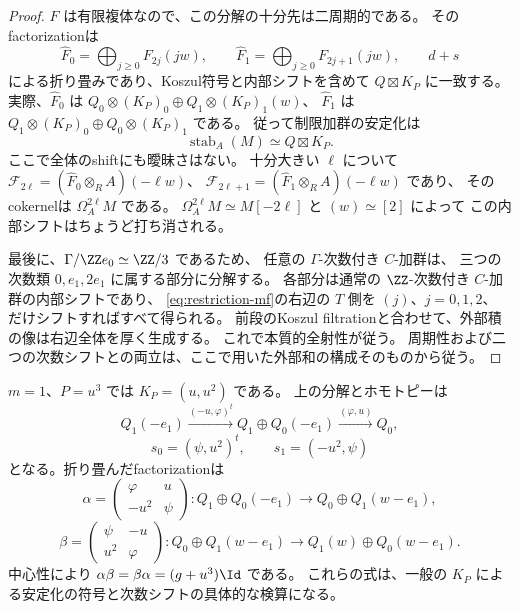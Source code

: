 \begin{proof}
 \(F\) は有限複体なので、この分解の十分先は二周期的である。
 そのfactorizationは
 \[
 \widehat F_0=\bigoplus_{j\ge0}F_{2j}(jw),\qquad
 \widehat F_1=\bigoplus_{j\ge0}F_{2j+1}(jw),
 \qquad d+s
 \]
 による折り畳みであり、Koszul符号と内部シフトを含めて
 \(Q\boxtimes K_P\) に一致する。
 実際、\(\widehat F_0\) は
 \(Q_0\otimes(K_P)_0\oplus Q_1\otimes(K_P)_1(w)\)、
 \(\widehat F_1\) は
 \(Q_1\otimes(K_P)_0\oplus Q_0\otimes(K_P)_1\) である。
 従って制限加群の安定化は
 \[
 \operatorname{stab}_A(M)\simeq Q\boxtimes K_P.               \tag{4g}\label{eq:restriction-mf}
 \]
 ここで全体のshiftにも曖昧さはない。
 十分大きい \(\ell\) について
 \(\mathcal F_{2\ell}=(\widehat F_0\otimes_R A)(-\ell w)\)、
 \(\mathcal F_{2\ell+1}=(\widehat F_1\otimes_R A)(-\ell w)\) であり、
 そのcokernelは \(\Omega_A^{2\ell}M\) である。
 \(\Omega_A^{2\ell}M\simeq M[-2\ell]\) と \((w)\simeq[2]\) によって
 この内部シフトはちょうど打ち消される。

 最後に、\(\Gamma/\ZZ e_0\simeq\ZZ/3\) であるため、
 任意の \(\Gamma\)-次数付き \(C\)-加群は、
 三つの次数類 \(0,e_1,2e_1\) に属する部分に分解する。
 各部分は通常の \(\ZZ\)-次数付き \(C\)-加群の内部シフトであり、
 \eqref{eq:restriction-mf}の右辺の \(T\) 側を \((j)\)、\(j=0,1,2\)、
 だけシフトすればすべて得られる。
 前段のKoszul filtrationと合わせて、外部積の像は右辺全体を厚く生成する。
 これで本質的全射性が従う。
 周期性および二つの次数シフトとの両立は、ここで用いた外部和の構成そのものから従う。
\end{proof}

\begin{remark}[一変数の場合の明示行列]\label{rem:central-one-variable}
 \(m=1\)、\(P=u^3\) では \(K_P=(u,u^2)\) である。
 上の分解とホモトピーは
 \[
 Q_1(-e_1)\xrightarrow{(-u,\varphi)^t}
 Q_1\oplus Q_0(-e_1)\xrightarrow{(\varphi,u)}Q_0,
 \]
 \[
 s_0=(\psi,u^2)^t,\qquad s_1=(-u^2,\psi)
 \]
 となる。折り畳んだfactorizationは
 \[
 \alpha=
 \begin{pmatrix}\varphi&u\\-u^2&\psi\end{pmatrix}:
 Q_1\oplus Q_0(-e_1)\longrightarrow Q_0\oplus Q_1(w-e_1),
 \]
 \[
 \beta=
 \begin{pmatrix}\psi&-u\\u^2&\varphi\end{pmatrix}:
 Q_0\oplus Q_1(w-e_1)\longrightarrow
 Q_1(w)\oplus Q_0(w-e_1).
 \]
 中心性により \(\alpha\beta=\beta\alpha=(g+u^3)\Id\) である。
 これらの式は、一般の \(K_P\) による安定化の符号と次数シフトの具体的な検算になる。
\end{remark}

